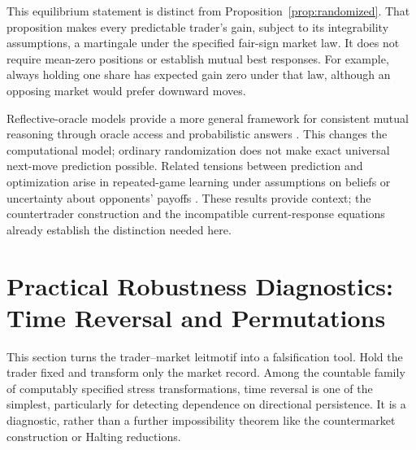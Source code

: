 \documentclass[aps,pra,reprint,superscriptaddress,amsmath,amssymb,floatfix]{revtex4-2}
\theoremstyle{plain}
\theoremstyle{definition}
\theoremstyle{remark}
\begin{document}
This equilibrium statement is distinct from
Proposition~\ref{prop:randomized}. That proposition makes every predictable
trader's gain, subject to its integrability assumptions, a martingale under
the specified fair-sign market law. It does not require mean-zero positions
or establish mutual best responses. For example, always holding one share
has expected gain zero under that law, although an opposing market would
prefer downward moves.

Reflective-oracle models provide a more general framework for consistent
mutual reasoning through oracle access and probabilistic answers
\cite{FallensteinTaylorChristiano2015}. This changes the computational model;
ordinary randomization does not make exact universal next-move prediction possible.
Related tensions between prediction and optimization arise in repeated-game
learning under assumptions on beliefs or uncertainty about opponents' payoffs
\cite{Nachbar1997,FosterYoung2001}. These results provide context; the
countertrader construction and the incompatible current-response equations
already establish the distinction needed here.

\section{Practical Robustness Diagnostics: Time Reversal and Permutations}
\label{sec:criterion}

This section turns the trader--market leitmotif into a falsification tool. Hold
the trader fixed and transform only the market record. Among the countable
family of computably specified stress transformations, time reversal is one of
the simplest, particularly for detecting dependence on directional
persistence. It is a diagnostic, rather than a further impossibility theorem
like the countermarket construction or Halting reductions.
\end{document}
